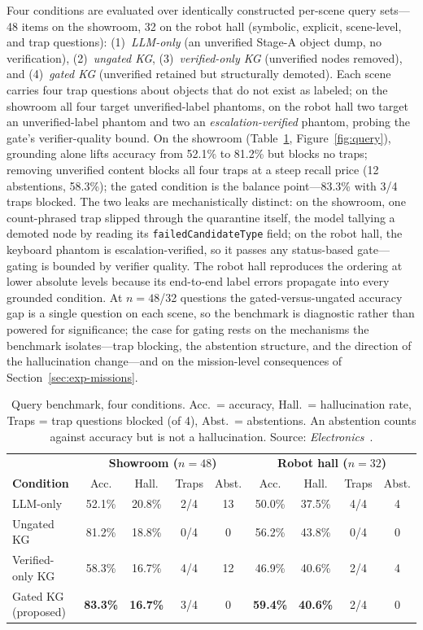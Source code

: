 Four conditions are evaluated over identically constructed per-scene query
sets---48 items on the showroom, 32 on the robot hall (symbolic, explicit,
scene-level, and trap questions): (1)~\emph{LLM-only} (an unverified Stage-A
object dump, no verification), (2)~\emph{ungated KG}, (3)~\emph{verified-only
KG} (unverified nodes removed), and (4)~\emph{gated KG} (unverified retained
but structurally demoted). Each scene carries four trap questions about
objects that do not exist as labeled; on the showroom all four target
unverified-label phantoms, on the robot hall two target an unverified-label
phantom and two an \emph{escalation-verified} phantom, probing the gate's
verifier-quality bound. On the showroom (Table~\ref{tab:query},
Figure~\ref{fig:query}), grounding alone lifts accuracy from 52.1\% to 81.2\%
but blocks no traps; removing unverified content blocks all four traps at a
steep recall price (12 abstentions, 58.3\%); the gated condition is the balance
point---83.3\% with 3/4 traps blocked. The two leaks are mechanistically
distinct: on the showroom, one count-phrased trap slipped through the
quarantine itself, the model tallying a demoted node by reading its
\texttt{failedCandidateType} field; on the robot hall, the keyboard phantom is
escalation-verified, so it passes any status-based gate---gating is bounded by
verifier quality. The robot hall reproduces the ordering at lower absolute
levels because its end-to-end label errors propagate into every grounded
condition. At $n=48$/32 questions the gated-versus-ungated accuracy gap is a
single question on each scene, so the benchmark is diagnostic rather than
powered for significance; the case for gating rests on the mechanisms the
benchmark isolates---trap blocking, the abstention structure, and the direction
of the hallucination change---and on the mission-level consequences of
Section~\ref{sec:exp-missions}.

\begin{table}[htbp]
\centering
\caption{Query benchmark, four conditions. Acc.\ = accuracy, Hall.\ =
hallucination rate, Traps = trap questions blocked (of 4), Abst.\ =
abstentions. An abstention counts against accuracy but is not a hallucination.
Source: \emph{Electronics}~\cite{kim2026electronics}.}
\label{tab:query}
\small
\begin{tabular}{l c c c c c c c c}
\toprule
 & \multicolumn{4}{c}{\textbf{Showroom ($n=48$)}} & \multicolumn{4}{c}{\textbf{Robot hall ($n=32$)}} \\
\textbf{Condition} & Acc. & Hall. & Traps & Abst. & Acc. & Hall. & Traps & Abst. \\
\midrule
LLM-only & 52.1\% & 20.8\% & 2/4 & 13 & 50.0\% & 37.5\% & 4/4 & 4 \\
Ungated KG & 81.2\% & 18.8\% & 0/4 & 0 & 56.2\% & 43.8\% & 0/4 & 0 \\
Verified-only KG & 58.3\% & 16.7\% & 4/4 & 12 & 46.9\% & 40.6\% & 2/4 & 4 \\
Gated KG (proposed) & \textbf{83.3\%} & \textbf{16.7\%} & 3/4 & 0 & \textbf{59.4\%} & \textbf{40.6\%} & 2/4 & 0 \\
\bottomrule
\end{tabular}
\end{table}

